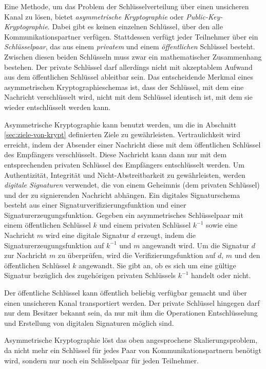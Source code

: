 Eine Methode, um das Problem der Schl\"usselverteilung \"uber einen
unsicheren Kanal zu l\"osen, bietet \emph{asymmetrische Kryptographie}
oder \emph{Public-Key-Kryptographie}. Dabei gibt es keinen einzelnen
Schl\"ussel, \"uber den alle Kommunikationspartner
verf\"ugen. Stattdessen verf\"ugt jeder Teilnehmer \"uber ein
\emph{Schl\"usselpaar}, das aus einem \emph{privatem} und einem
\emph{\"offentlichen} Schl\"ussel besteht. Zwischen diesen beiden
Schl\"usseln muss zwar ein mathematischer Zusammenhang bestehen. Der
private Schl\"ussel darf allerdings nicht mit akzeptablem Aufwand aus
dem \"offentlichen Schl\"ussel ableitbar sein. Das entscheidende
Merkmal eines asymmetrischen Kryptographieschemas ist, dass der
Schl\"ussel, mit dem eine Nachricht verschl\"usselt wird, nicht mit
dem Schl\"ussel identisch ist, mit dem sie wieder entschl\"usselt
werden kann.

Asymmetrische Kryptographie kann benutzt werden, um die in Abschnitt
\ref{sec:ziele-von-krypt} definierten Ziele zu
gew\"ahrleisten. Vertraulichkeit wird erreicht, indem der Absender
einer Nachricht diese mit dem \"offentlichen Schl\"ussel des
Empf\"angers verschl\"usselt. Diese Nachricht kann dann nur mit dem
entsprechenden privaten Schl\"ussel des Empf\"angers entschl\"usselt
werden. Um Authentizit\"at, Integrit\"at und Nicht-Abstreitbarkeit zu
gew\"ahrleisten, werden \emph{digitale Signaturen} verwendet, die von
einem Geheimnis (dem privaten Schl\"ussel) und der zu signierenden
Nachricht abh\"angen. Ein digitales Signaturschema besteht aus einer
Signaturverifizierungsfunktion und einer
Signaturerzeugungsfunktion. Gegeben ein asymmetrisches Schl\"usselpaar
mit einem \"offentlichen Schl\"ussel $k$ und einem privaten
Schl\"ussel $k^{-1}$ sowie eine Nachricht $m$ wird eine digitale
Signatur $d$ erzeugt, indem die Signaturerzeugungsfunktion auf
$k^{-1}$ und $m$ angewandt wird. Um die Signatur $d$ zur Nachricht $m$
zu \"uberpr\"ufen, wird die Verifizierungsfunktion auf $d$, $m$ und
den \"offentlichen Schl\"ussel $k$ angewandt. Sie gibt an, ob es sich
um eine g\"ultige Signatur bez\"uglich des zugeh\"origen privaten
Schl\"ussels $k^{-1}$ handelt oder nicht.

Der \"offentliche Schl\"ussel kann \"offentlich beliebig verf\"ugbar
gemacht und \"uber einen unsicheren Kanal transportiert werden. Der
private Schl\"ussel hingegen darf nur dem Besitzer bekannt sein, da
nur mit ihm die Operationen Entschl\"usselung und Erstellung von
digitalen Signaturen m\"oglich sind.

Asymmetrische Kryptographie l\"ost das oben angesprochene
Skalierungsproblem, da nicht mehr ein Schl\"ussel f\"ur jedes Paar von
Kommunikationspartnern ben\"otigt wird, sondern nur noch ein
Schl\"sselpaar f\"ur jeden Teilnehmer.

